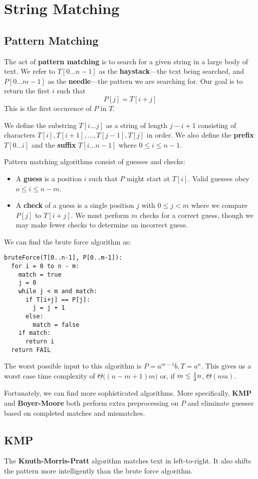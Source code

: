 \documentclass[12pt]{article}
\begin{document}
\section{String Matching}
\subsection{Pattern Matching}
The act of {\bf pattern matching} is to search for a given string in a large body of text. We refer to $T[0\dots n-1]$ as the {\bf haystack}---the text being searched, and $P[0\dots m-1]$ as the {\bf needle}---the pattern we are searching for. Our goal is to return the first $i$ such that \[ P[j] = T[i+j] \] This is the first occurence of $P$ in $T$.

We define the substring $T[i\dots j]$ as a string of length $j-i+1$ consisting of characters $T[i], T[i+1], \dots, T[j-1], T[j]$ in order. We also define the {\bf prefix} $T[0\dots i]$ and the {\bf suffix} $T[i\dots n-1]$ where $0 \leq i \leq n-1$.

Pattern matching algorithms consist of guesses and checks:
\begin{itemize}
\item A {\bf guess} is a position $i$ such that $P$ might start at $T[i]$. Valid guesses obey $o \leq i \leq n-m$.
\item A {\bf check} of a guess is a single position $j$ with $0 \leq j < m$ where we compare $P[j]$ to $T[i+j]$. We must perform $m$ checks for a correct guess, though we may make fewer checks to determine an incorrect guess.
\end{itemize}

We can find the brute force algorithm as:
\begin{verbatim}
bruteForce(T[0..n-1], P[0..m-1]):
  for i = 0 to n - m:
    match = true
    j = 0
    while j < m and match:
      if T[i+j] == P[j]:
        j = j + 1
      else:
        match = false
    if match:
      return i
  return FAIL
\end{verbatim}

The worst possible input to this algorithm is $P = a^{m-1}b, T = a^n$. This gives us a worst case time complexity of $\Theta\bigl((n-m+1)m\bigl)$ or, if $m \leq \frac{1}{2} n$, $\Theta(nm)$.

Fortunately, we can find more sophisticated algorithms. More specifically, {\bf KMP} and {\bf Boyer-Moore} both perform extra preprocessing on $P$ and eliminate guesses based on completed matches and mismatches.

\subsection{KMP}
The {\bf Knuth-Morris-Pratt} algorithm matches text in left-to-right. It also shifts the pattern more intelligently than the brute force algorithm.
\end{document}
